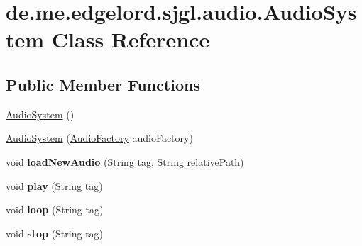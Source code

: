 \hypertarget{classde_1_1me_1_1edgelord_1_1sjgl_1_1audio_1_1_audio_system}{}\section{de.\+me.\+edgelord.\+sjgl.\+audio.\+Audio\+System Class Reference}
\label{classde_1_1me_1_1edgelord_1_1sjgl_1_1audio_1_1_audio_system}
\subsection*{Public Member Functions}
\begin{DoxyCompactItemize}
\item 
\mbox{\hyperlink{classde_1_1me_1_1edgelord_1_1sjgl_1_1audio_1_1_audio_system_a32ecdc18393cafddf6195195ac1be202}{Audio\+System}} ()
\item 
\mbox{\hyperlink{classde_1_1me_1_1edgelord_1_1sjgl_1_1audio_1_1_audio_system_a332604b3b6fce17335bf6180ba15dd9b}{Audio\+System}} (\mbox{\hyperlink{classde_1_1me_1_1edgelord_1_1sjgl_1_1factory_1_1_audio_factory}{Audio\+Factory}} audio\+Factory)
\item 
\mbox{\label{classde_1_1me_1_1edgelord_1_1sjgl_1_1audio_1_1_audio_system_a582620714de0dba106d61a4f124ec98e}} 
void {\bfseries load\+New\+Audio} (String tag, String relative\+Path)
\item 
\mbox{\label{classde_1_1me_1_1edgelord_1_1sjgl_1_1audio_1_1_audio_system_a60f7bfbf06d563fa48ca7c576508ff6a}} 
void {\bfseries play} (String tag)
\item 
\mbox{\label{classde_1_1me_1_1edgelord_1_1sjgl_1_1audio_1_1_audio_system_a54fb3b524cd02fb3da15d2ec4ac3c621}} 
void {\bfseries loop} (String tag)
\item 
\mbox{\label{classde_1_1me_1_1edgelord_1_1sjgl_1_1audio_1_1_audio_system_a532ddedf81dc10e84f1a42de07f8dd41}} 
void {\bfseries stop} (String tag)
\item 
\mbox{\label{classde_1_1me_1_1edgelord_1_1sjgl_1_1audio_1_1_audio_system_ae993e182cd1fbd5b0e673b530a4ed9b7}} 

\end{DoxyCompactItemize}
